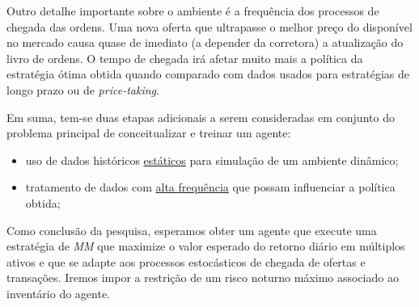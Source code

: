 Outro detalhe importante sobre o ambiente é a frequência dos processos de chegada das ordens. Uma nova oferta que ultrapasse o melhor preço do disponível no mercado causa quase de imediato (a depender da corretora) a atualização do livro de ordens. O tempo de chegada irá afetar muito mais a política da estratégia ótima obtida quando comparado com dados usados para estratégias de longo prazo ou de \textit{price-taking}.

Em suma, tem-se duas etapas adicionais a serem consideradas em conjunto do problema principal de conceitualizar e treinar um agente: 
\begin{itemize}
    \item uso de dados históricos \underline{estáticos} para simulação de um ambiente dinâmico;
    \item tratamento de dados com \underline{alta frequência} que possam influenciar a política obtida;
\end{itemize}

Como conclusão da pesquisa, esperamos obter um agente que execute uma estratégia de \textit{MM} que maximize o valor esperado do retorno diário em múltiplos ativos e que se adapte aos processos estocásticos de chegada de ofertas e transações. Iremos impor a restrição de um risco noturno máximo associado ao inventário do agente. 

